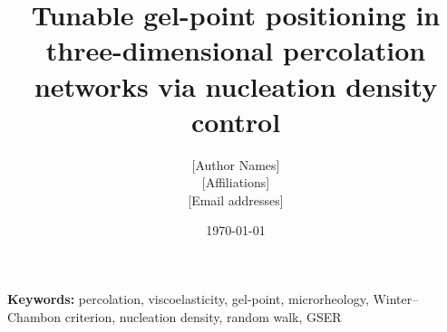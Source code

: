 \documentclass[12pt]{article}
\title{Tunable gel-point positioning in three-dimensional percolation networks via nucleation density control}
\author{
    {[Author Names]} \\
    {[Affiliations]} \\
    {[Email addresses]}
}
\date{\today}
\begin{document}
\maketitle



\noindent\textbf{Keywords:} percolation, viscoelasticity, gel-point, microrheology, Winter--Chambon criterion, nucleation density, random walk, GSER












\appendix





\end{document}
